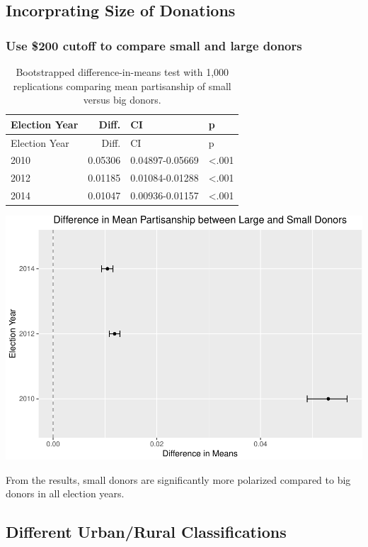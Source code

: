 \documentclass[10pt,]{article}
\begin{document}
\hypertarget{incorprating-size-of-donations}{%
\subsection{Incorprating Size of
Donations}\label{incorprating-size-of-donations}}

\hypertarget{use-200-cutoff-to-compare-small-and-large-donors}{%
\subsubsection{Use \$200 cutoff to compare small and large
donors}\label{use-200-cutoff-to-compare-small-and-large-donors}}

\begin{longtable}[]{@{}lrll@{}}
\caption{Bootstrapped difference-in-means test with 1,000 replications
comparing mean partisanship of small versus big donors.}\tabularnewline
\toprule
Election Year & Diff. & CI & p\tabularnewline
\midrule
\endfirsthead
\toprule
Election Year & Diff. & CI & p\tabularnewline
\midrule
\endhead
2010 & 0.05306 & 0.04897-0.05669 & \textless.001\tabularnewline
2012 & 0.01185 & 0.01084-0.01288 & \textless.001\tabularnewline
2014 & 0.01047 & 0.00936-0.01157 & \textless.001\tabularnewline
\bottomrule
\end{longtable}

\includegraphics{scratch_files/figure-latex/unnamed-chunk-20-1.pdf}

From the results, small donors are significantly more polarized compared
to big donors in all election years.

\newpage

\hypertarget{different-urbanrural-classifications}{%
\subsection{Different Urban/Rural
Classifications}\label{different-urbanrural-classifications}}
\end{document}
